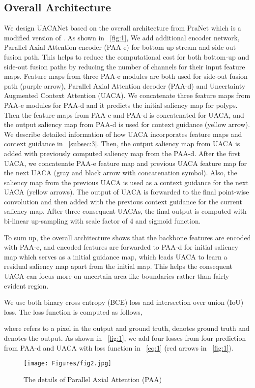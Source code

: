 \documentclass[sigconf]{acmart}
\begin{document}
\subsection{Overall Architecture}

We design UACANet based on the overall architecture from PraNet\cite{fan2020pranet} which is a modified version of \cite{chen2018reverse}. As shown in \figureautorefname~\ref{fig:1}, We add additional encoder network, Parallel Axial Attention encoder (PAA-e) for bottom-up stream and side-out fusion path. This helps to reduce the computational cost for both bottom-up and side-out fusion paths by reducing the number of channels for their input feature maps. Feature maps from three PAA-e modules are both used for side-out fusion path (purple arrow), Parallel Axial Attention decoder (PAA-d) and Uncertainty Augmented Context Attention (UACA). We concatenate three feature maps from PAA-e modules for PAA-d and it predicts the initial saliency map for polyps. Then the feature maps from PAA-e and PAA-d is concatenated for UACA, and the output saliency map from PAA-d is used for context guidance (yellow arrow). We describe detailed information of how UACA incorporates feature maps and context guidance in \sectionautorefname~\ref{subsec:3}. Then, the output saliency map from UACA is added with previously computed saliency map from the PAA-d. After the first UACA, we concatenate PAA-e feature map and previous UACA feature map for the next UACA (gray and black arrow with concatenation symbol). Also, the saliency map from the previous UACA is used as a context guidance for the next UACA (yellow arrows). The output of UACA is forwarded to the final point-wise convolution and then added with the previous context guidance for the current saliency map. After three consequent UACAs, the final output is computed with bi-linear up-sampling with scale factor of 4 and sigmoid function.

To sum up, the overall architecture shows that the backbone features are encoded with PAA-e, and encoded features are forwarded to PAA-d for initial saliency map which serves as a initial guidance map, which leads UACA to learn a residual saliency map apart from the initial map. This helps the consequent UACA can focus more on uncertain area like boundaries rather than fairly evident region.

We use both binary cross entropy (BCE) loss and intersection over union (IoU) loss. The loss function  is computed as follows,


where  refers to a pixel in the output and ground truth,  denotes ground truth and  denotes the output. As shown in \figureautorefname~\ref{fig:1}, we add four losses from four prediction from PAA-d and UACA with loss function in \equationautorefname~\ref{eq:1} (red arrows in \figureautorefname~\ref{fig:1}).
\begin{figure}[]
  \centering
  \texttt{[image: Figures/fig2.jpg]}
  \caption{The details of Parallel Axial Attention (PAA)}
    \label{fig:2}
\end{figure}
\end{document}
